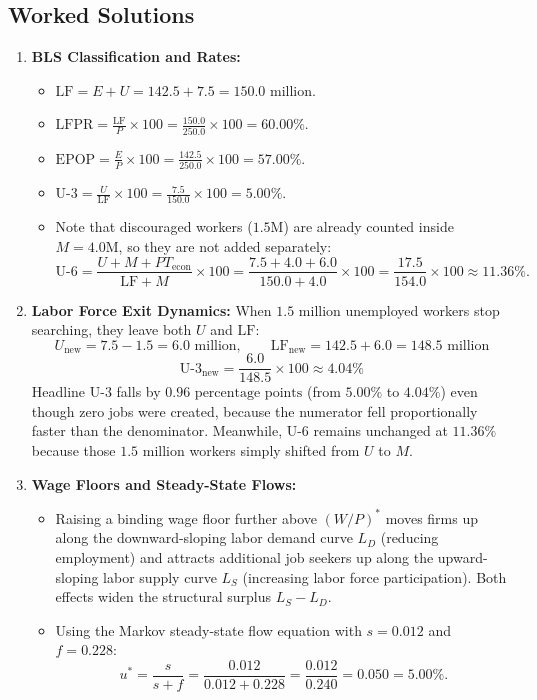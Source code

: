 \documentclass[11pt, a4paper]{article}
\begin{document}
\subsection*{Worked Solutions}
\begin{enumerate}[leftmargin=1.5em, itemsep=6pt]
  \item \textbf{BLS Classification and Rates:}
  \begin{itemize}[leftmargin=1.2em, itemsep=2pt]
    \item[(a)] $\text{LF} = E + U = 142.5 + 7.5 = 150.0\text{ million}$.
    \item[(b)] $\text{LFPR} = \frac{\text{LF}}{P} \times 100 = \frac{150.0}{250.0} \times 100 = 60.00\%$.
    \item[(c)] $\text{EPOP} = \frac{E}{P} \times 100 = \frac{142.5}{250.0} \times 100 = 57.00\%$.
    \item[(d)] $\text{U-3} = \frac{U}{\text{LF}} \times 100 = \frac{7.5}{150.0} \times 100 = 5.00\%$.
    \item[(e)] Note that discouraged workers ($1.5\text{M}$) are already counted inside $M = 4.0\text{M}$, so they are not added separately:
    \[
      \text{U-6} = \frac{U + M + PT_{\text{econ}}}{\text{LF} + M} \times 100 = \frac{7.5 + 4.0 + 6.0}{150.0 + 4.0} \times 100 = \frac{17.5}{154.0} \times 100 \approx 11.36\%.
    \]
  \end{itemize}

  \item \textbf{Labor Force Exit Dynamics:}
  When $1.5\text{ million}$ unemployed workers stop searching, they leave both $U$ and $\text{LF}$:
  \[
    U_{\text{new}} = 7.5 - 1.5 = 6.0\text{ million}, \qquad \text{LF}_{\text{new}} = 142.5 + 6.0 = 148.5\text{ million}
  \]
  \[
    \text{U-3}_{\text{new}} = \frac{6.0}{148.5} \times 100 \approx 4.04\%
  \]
  Headline $\text{U-3}$ falls by $0.96\text{ percentage points}$ (from $5.00\%$ to $4.04\%$) even though zero jobs were created, because the numerator fell proportionally faster than the denominator. Meanwhile, $\text{U-6}$ remains unchanged at $11.36\%$ because those $1.5\text{ million}$ workers simply shifted from $U$ to $M$.

  \item \textbf{Wage Floors and Steady-State Flows:}
  \begin{itemize}[leftmargin=1.2em, itemsep=2pt]
    \item[(a)] Raising a binding wage floor further above $(W/P)^*$ moves firms up along the downward-sloping labor demand curve $L_D$ (reducing employment) and attracts additional job seekers up along the upward-sloping labor supply curve $L_S$ (increasing labor force participation). Both effects widen the structural surplus $L_S - L_D$.
    \item[(b)] Using the Markov steady-state flow equation with $s = 0.012$ and $f = 0.228$:
    \[
      u^* = \frac{s}{s + f} = \frac{0.012}{0.012 + 0.228} = \frac{0.012}{0.240} = 0.050 = 5.00\%.
    \]
  \end{itemize}


\end{enumerate}
\end{document}
